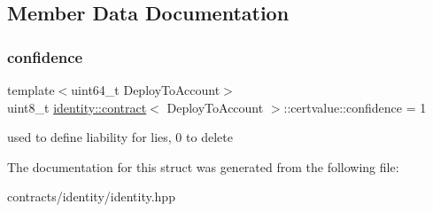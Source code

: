 \subsection{Member Data Documentation}
\mbox{\label{structidentity_1_1contract_1_1certvalue_a009857ed1526837660ba974428e7fcf9}} 
\subsubsection{\texorpdfstring{confidence}{confidence}}
{\footnotesize\ttfamily template$<$uint64\+\_\+t Deploy\+To\+Account$>$ \\
uint8\+\_\+t \mbox{\hyperlink{classidentity_1_1contract}{identity\+::contract}}$<$ Deploy\+To\+Account $>$\+::certvalue\+::confidence = 1}

used to define liability for lies, 0 to delete 

The documentation for this struct was generated from the following file\+:\begin{DoxyCompactItemize}
\item 
contracts/identity/identity.\+hpp\end{DoxyCompactItemize}
